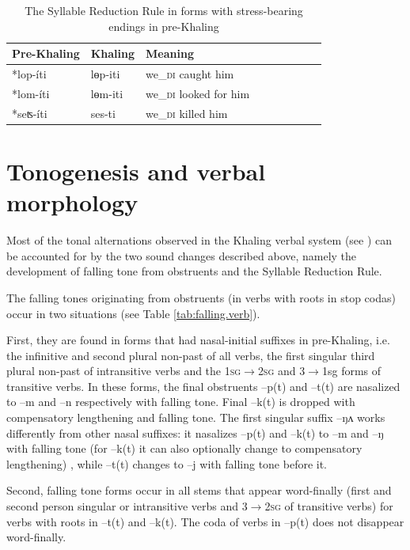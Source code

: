 \documentclass[oldfontcommands,oneside,a4paper,11pt]{article}
\newcommand{\ipa}[1]{{\phon \mbox{#1}}} %
\begin{document}
\begin{table}[h] 
\caption{The  Syllable Reduction Rule in forms with stress-bearing endings in pre-Khaling} \centering  \label{tab:verbal.du} 
\begin{tabular}{lllllllll} 
\toprule 
Pre-Khaling	&Khaling &Meaning\\
\midrule
\ipa{*lop-íti}  & \ipa{lɵp-iti} & we_{\textsc{di}} caught him \\ 
\ipa{*lom-íti}  & \ipa{lɵm-iti} & we_{\textsc{di}} looked for him \\
\midrule
\ipa{*seʦ-íti} & \ipa{ses-ti} & we_{\textsc{di}} killed him \\ 
\bottomrule
\end{tabular}
\end{table}



\section{Tonogenesis and verbal morphology} \label{sec:tonogenesis.verb}
Most of the tonal alternations observed in the Khaling verbal system (see \citealt{jacques12khaling}) can be accounted for by the two sound changes described above, namely the development of falling tone from obstruents and the Syllable Reduction Rule.

 The falling tones originating from obstruents (in verbs with roots in stop codas) occur in two situations (see Table \ref{tab:falling.verb}).
 
 First, they are found  in forms that had nasal-initial suffixes in pre-Khaling, i.e. the infinitive and second plural non-past of all verbs, the first singular third plural non-past of intransitive verbs  and the   \textsc{1sg$\rightarrow$2sg} and {3$\rightarrow$1sg} forms of transitive verbs. In these forms, the final obstruents \ipa{--p(t)} and  \ipa{--t(t)} are nasalized to \ipa{--m} and \ipa{--n} respectively with falling tone. Final \ipa{--k(t)} is dropped with compensatory lengthening and falling tone. The first singular suffix \ipa{--ŋʌ} works differently from other nasal suffixes:  it nasalizes \ipa{--p(t)} and   \ipa{--k(t)} to \ipa{--m} and \ipa{--ŋ} with falling tone (for  \ipa{--k(t)}  it can also optionally change to compensatory lengthening) , while \ipa{--t(t)} changes to \ipa{--j} with falling tone before it.
 
 Second, falling tone forms occur in all stems that appear word-finally (first and second person singular or intransitive verbs and \textsc{3$\rightarrow$2sg} of transitive verbs) for verbs with roots in \ipa{--t(t)} and   \ipa{--k(t)}. The coda of verbs in \ipa{--p(t)} does not disappear word-finally.
\end{document}
